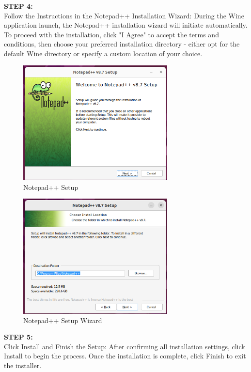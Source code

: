 \documentclass[12pt]{article}
\begin{document}
\begin{spacing}{1.5}
\begin{adjustwidth}{0cm}{0cm}
\begin{justify}
\textbf{STEP 4:} \\
Follow the Instructions in the Notepad++ Installation Wizard: During the Wine application launch, the Notepad++ installation wizard will initiate automatically. To proceed with the installation, click "I Agree" to accept the terms and conditions, then choose your preferred installation directory - either opt for the default Wine directory or specify a custom location of your choice.

\begin{figure}[H]
    \centering
    \includegraphics[width=0.7\textwidth]{exp 4/image1.png}
    \caption{Notepad++ Setup }
    \label{fig: 1}
\end{figure}

\begin{figure}[H]
    \centering
    \includegraphics[width=0.7\textwidth]{exp 4/image2.png}
    \caption{Notepad++ Setup Wizard }
    \label{fig: 1}
\end{figure}

\textbf{STEP 5:} \\
Click Install and Finish the Setup: After confirming all installation settings, click Install to begin the process. Once the installation is complete, click Finish to exit the installer.


\end{justify}
\end{adjustwidth}
\end{spacing}
\end{document}
